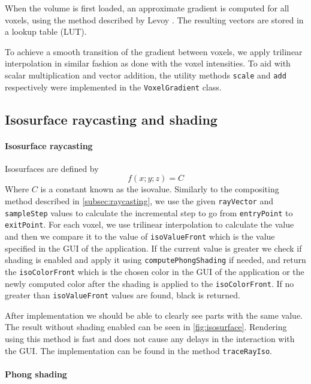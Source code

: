 \documentclass[a4paper]{article}
\begin{document}
\noindent When the volume is first loaded, an approximate gradient is computed for all voxels, using the method described by Levoy \citep{levoy_1988}. The resulting vectors are stored in a lookup table (LUT).

To achieve a smooth transition of the gradient between voxels, we apply trilinear interpolation in similar fashion as done with the voxel intensities. To aid with scalar multiplication and vector addition, the utility methods {\tt scale} and {\tt add} respectively were implemented in the {\tt VoxelGradient} class.

\subsection{Isosurface raycasting and shading}
\label{subsec:isosurface}

\paragraph{Isosurface raycasting}

Isosurfaces are defined by
 $$f(x; y; z) = C$$ 
Where $C$ is a constant known as the isovalue. Similarly to the compositing method described in \autoref{subsec:raycasting}, we use the given {\tt rayVector} and {\tt sampleStep} values to calculate the incremental step to go from {\tt entryPoint} to {\tt exitPoint}. For each voxel, we use trilinear interpolation to calculate the value and then we compare it to the value of {\tt isoValueFront} which is the value specified in the GUI of the application. If the current value is greater we check if shading is enabled and apply it using {\tt computePhongShading} if needed, and return the {\tt isoColorFront} which is the chosen color in the GUI of the application or the newly computed color after the shading is applied to the  {\tt isoColorFront}. If no greater than {\tt isoValueFront} values are found, black is returned.

After implementation we should be able to clearly see parts with the same value. The result without shading enabled can be seen in \autoref{fig:isosurface}. Rendering using this method is fast and does not cause any delays in the interaction with the GUI. The implementation can be found in the method {\tt traceRayIso}.

\paragraph{Phong shading}
\end{document}
